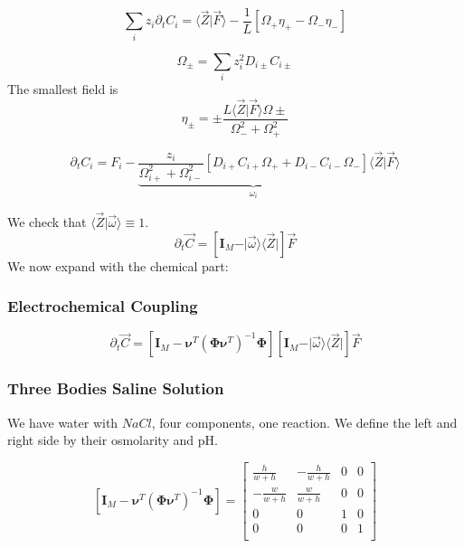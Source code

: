 \documentclass[aps,12pt]{revtex4}
\begin{document}
\begin{equation}
	\sum_i z_i \partial_t C_i =  \langle \vec Z \vert \vec F \rangle - \dfrac{1}{L} \left[ \Omega_+ \eta_{+} - \Omega_- \eta_-\right]
\end{equation}

\begin{equation}
	\Omega_\pm = \sum_i z_i^2 D_{i\pm} C_{i\pm}
\end{equation}
The smallest field is 
\begin{equation}
	\eta_\pm = \pm \dfrac{L \langle \vec Z \vert \vec F \rangle \Omega\pm}{\Omega_-^2+\Omega_+^2}
\end{equation}

\begin{equation}
	\partial_t C_i = F_i - \underbrace{\dfrac{z_i}{\Omega_{i+}^2 + \Omega_{i-}^2} \left[ D_{i+} C_{i+} \Omega_+ + D_{i-} C_{i-} \Omega_- \right]}_{\omega_i} \langle \vec Z \vert \vec F \rangle
\end{equation}

We check that $\langle \vec Z \vert \vec \omega \rangle \equiv 1$.
\begin{equation}
\boxed{
	\partial_t \vec C = \left[\bm I_M - \vert\vec \omega \rangle \langle \vec Z \vert \right] \vec F
	}
\end{equation}
We now expand with the chemical part:


\subsubsection{Electrochemical Coupling}

\begin{equation}
	\partial_t \vec C = \left[\bm{I}_M - \bm{\nu}^T (\bm \Phi \bm{\nu}^T) ^{-1} \bm \Phi \right] \left[\bm I_M - \vert\vec \omega \rangle \langle \vec Z \vert \right] \vec F
\end{equation}


\subsubsection{Three Bodies Saline Solution}

We have water with $NaCl$, four components, one reaction.
We define the left and right side by their osmolarity and pH.

\begin{equation}
\left[\bm{I}_M - \bm{\nu}^T (\bm \Phi \bm{\nu}^T) ^{-1} \bm \Phi \right]
=
\begin{bmatrix}
\frac{h}{w+h} & - \frac{h}{w+h} & 0 & 0\\
-\frac{w}{w+h} & \frac{w}{w+h}  & 0 & 0\\
0 & 0 & 1 & 0\\
0 & 0 & 0 & 1\\
\end{bmatrix}
\end{equation}
\end{document}
